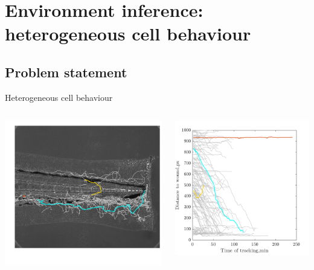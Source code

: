 \documentclass[mathserif,11pt]{beamer}
\begin{document}
\section{Environment inference: heterogeneous cell behaviour}
\subsection{Problem statement}
\begin{frame}{Heterogeneous cell behaviour}
\begin{columns}
	\begin{column}{0.5\textwidth}
		\centering
		\includegraphics[scale=0.31]{Figures/example_tracks.png}
	\end{column}
	\begin{column}{0.5\textwidth}
		\centering
		\includegraphics[scale=0.34]{Figures/example_distances.png}

\end{column}
\end{columns}
\end{frame}
\end{document}

